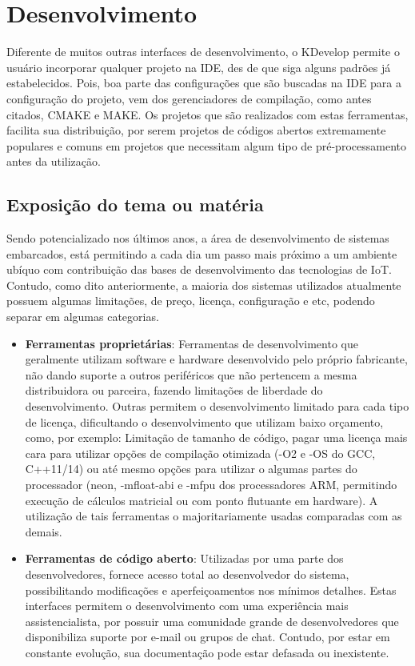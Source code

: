 \chapter{Desenvolvimento}

Diferente de muitos outras interfaces de desenvolvimento, o KDevelop permite o usuário incorporar qualquer projeto na IDE,
des de que siga alguns padrões já estabelecidos. Pois, boa parte das configurações que são buscadas na IDE para a configuração do projeto, vem dos gerenciadores de compilação, como antes citados, CMAKE e MAKE. Os projetos que são realizados com estas ferramentas, facilita sua distribuição, por serem projetos de códigos abertos extremamente populares e comuns em projetos que necessitam algum tipo de pré-processamento antes da utilização.

\section{Exposição do tema ou matéria}

Sendo potencializado nos últimos anos, a área de desenvolvimento de sistemas embarcados, está permitindo a cada dia um passo mais próximo a um ambiente ubíquo com contribuição das bases de desenvolvimento das tecnologias de IoT. Contudo, como dito anteriormente, a maioria dos sistemas utilizados atualmente possuem algumas limitações, de preço, licença, configuração e etc, podendo separar em algumas categorias.

\begin{itemize}
 \item \textbf{Ferramentas proprietárias}: Ferramentas de desenvolvimento que geralmente utilizam software e hardware desenvolvido pelo próprio fabricante, não dando suporte a outros periféricos que não pertencem a mesma distribuidora ou parceira, fazendo limitações de liberdade do desenvolvimento. Outras permitem o desenvolvimento limitado para cada tipo de licença, dificultando o desenvolvimento que utilizam baixo orçamento, como, por exemplo: Limitação de tamanho de código\cite{simplicity}, pagar uma licença mais cara para utilizar opções de compilação otimizada (-O2 e -OS do GCC, C++11/14)\cite{armdeveloper} ou até mesmo opções para utilizar o algumas partes do processador (neon, -mfloat-abi e -mfpu dos processadores ARM, permitindo execução de cálculos matricial ou com ponto flutuante em hardware)\cite{neon}. A utilização de tais ferramentas o majoritariamente usadas comparadas com as demais.

 \item \textbf{Ferramentas de código aberto}: Utilizadas por uma parte dos desenvolvedores, fornece acesso total ao desenvolvedor do sistema, possibilitando modificações e aperfeiçoamentos nos mínimos detalhes. Estas interfaces permitem o desenvolvimento com uma experiência mais assistencialista, por possuir uma comunidade grande de desenvolvedores que disponibiliza suporte por e-mail ou grupos de chat. Contudo, por estar em constante evolução, sua documentação pode estar defasada ou inexistente.

\end{itemize}


